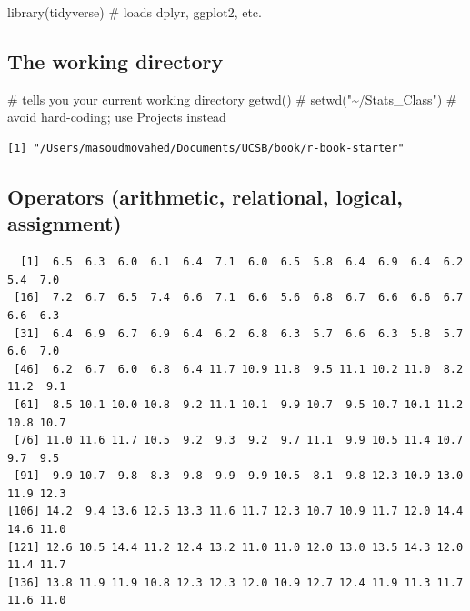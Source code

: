 \documentclass[
  letterpaper,
  DIV=11,
  numbers=noendperiod]{scrreprt}
\newenvironment{Shaded}{\begin{snugshade}}{\end{snugshade}}
\newcommand{\CommentTok}[1]{\textcolor[rgb]{0.37,0.37,0.37}{#1}}
\newcommand{\FunctionTok}[1]{\textcolor[rgb]{0.28,0.35,0.67}{#1}}
\newcommand{\NormalTok}[1]{\textcolor[rgb]{0.00,0.23,0.31}{#1}}
\newcommand{\OtherTok}[1]{\textcolor[rgb]{0.00,0.23,0.31}{#1}}
\newcommand{\SpecialCharTok}[1]{\textcolor[rgb]{0.37,0.37,0.37}{#1}}
\begin{document}
\begin{Shaded}
\begin{Highlighting}[]
\FunctionTok{library}\NormalTok{(tidyverse)                }\CommentTok{\# loads dplyr, ggplot2, etc.}
\end{Highlighting}
\end{Shaded}

\subsection{The working directory}\label{the-working-directory}

\begin{Shaded}
\begin{Highlighting}[]
\CommentTok{\# tells you your current working directory}
\FunctionTok{getwd}\NormalTok{()     }\CommentTok{\# setwd("\textasciitilde{}/Stats\_Class")  \# avoid hard{-}coding; use Projects instead}
\end{Highlighting}
\end{Shaded}

\begin{verbatim}
[1] "/Users/masoudmovahed/Documents/UCSB/book/r-book-starter"
\end{verbatim}

\subsection{Operators (arithmetic, relational, logical,
assignment)}\label{operators-arithmetic-relational-logical-assignment}

\begin{Shaded}
\end{Shaded}

\begin{verbatim}
  [1]  6.5  6.3  6.0  6.1  6.4  7.1  6.0  6.5  5.8  6.4  6.9  6.4  6.2  5.4  7.0
 [16]  7.2  6.7  6.5  7.4  6.6  7.1  6.6  5.6  6.8  6.7  6.6  6.6  6.7  6.6  6.3
 [31]  6.4  6.9  6.7  6.9  6.4  6.2  6.8  6.3  5.7  6.6  6.3  5.8  5.7  6.6  7.0
 [46]  6.2  6.7  6.0  6.8  6.4 11.7 10.9 11.8  9.5 11.1 10.2 11.0  8.2 11.2  9.1
 [61]  8.5 10.1 10.0 10.8  9.2 11.1 10.1  9.9 10.7  9.5 10.7 10.1 11.2 10.8 10.7
 [76] 11.0 11.6 11.7 10.5  9.2  9.3  9.2  9.7 11.1  9.9 10.5 11.4 10.7  9.7  9.5
 [91]  9.9 10.7  9.8  8.3  9.8  9.9  9.9 10.5  8.1  9.8 12.3 10.9 13.0 11.9 12.3
[106] 14.2  9.4 13.6 12.5 13.3 11.6 11.7 12.3 10.7 10.9 11.7 12.0 14.4 14.6 11.0
[121] 12.6 10.5 14.4 11.2 12.4 13.2 11.0 11.0 12.0 13.0 13.5 14.3 12.0 11.4 11.7
[136] 13.8 11.9 11.9 10.8 12.3 12.3 12.0 10.9 12.7 12.4 11.9 11.3 11.7 11.6 11.0
\end{verbatim}
\end{document}
